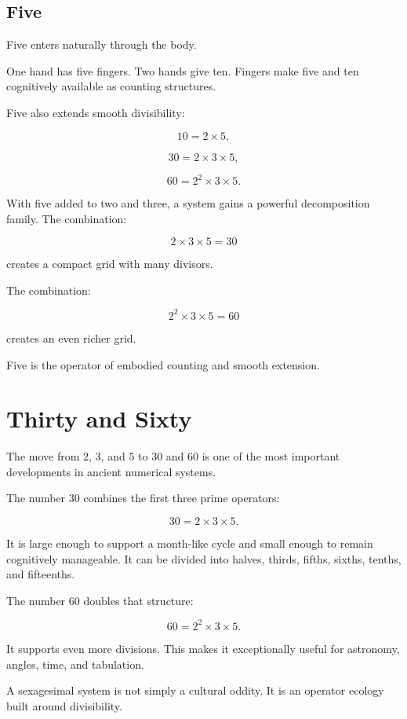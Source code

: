 \documentclass[11pt]{book}
\begin{document}
\subsection{Five}

Five enters naturally through the body.

One hand has five fingers. Two hands give ten. Fingers make five and ten cognitively available as counting structures.

Five also extends smooth divisibility:

\[
10 = 2 \times 5,
\]

\[
30 = 2 \times 3 \times 5,
\]

\[
60 = 2^2 \times 3 \times 5.
\]

With five added to two and three, a system gains a powerful decomposition family. The combination:

\[
2 \times 3 \times 5 = 30
\]

creates a compact grid with many divisors.

The combination:

\[
2^2 \times 3 \times 5 = 60
\]

creates an even richer grid.

Five is the operator of embodied counting and smooth extension.

\section{Thirty and Sixty}

The move from \(2\), \(3\), and \(5\) to \(30\) and \(60\) is one of the most important developments in ancient numerical systems.

The number \(30\) combines the first three prime operators:

\[
30 = 2 \times 3 \times 5.
\]

It is large enough to support a month-like cycle and small enough to remain cognitively manageable. It can be divided into halves, thirds, fifths, sixths, tenths, and fifteenths.

The number \(60\) doubles that structure:

\[
60 = 2^2 \times 3 \times 5.
\]

It supports even more divisions. This makes it exceptionally useful for astronomy, angles, time, and tabulation.

A sexagesimal system is not simply a cultural oddity. It is an operator ecology built around divisibility.
\end{document}
